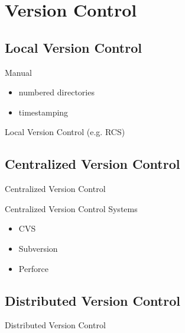 \documentclass{beamer}
\begin{document}
\section{Version Control}

\subsection{Local Version Control}

\begin{frame}{Manual}
  \begin{itemize}
  \item
    numbered directories
  \item
    timestamping
  \end{itemize}
\end{frame}

\begin{frame}{Local Version Control (e.g. RCS)}
    \centering
    \hfill\vfill
\end{frame}

\subsection{Centralized Version Control}

\begin{frame}{Centralized Version Control}
    \centering
    \hfill\vfill
\end{frame}

\begin{frame}{Centralized Version Control Systems}
  \begin{itemize}
  \item
    CVS
  \item
    Subversion
  \item
    Perforce
  \end{itemize}
\end{frame}


\subsection{Distributed Version Control}

\begin{frame}{Distributed Version Control}
    \centering
    \hfill\vfill
\end{frame}
\end{document}
